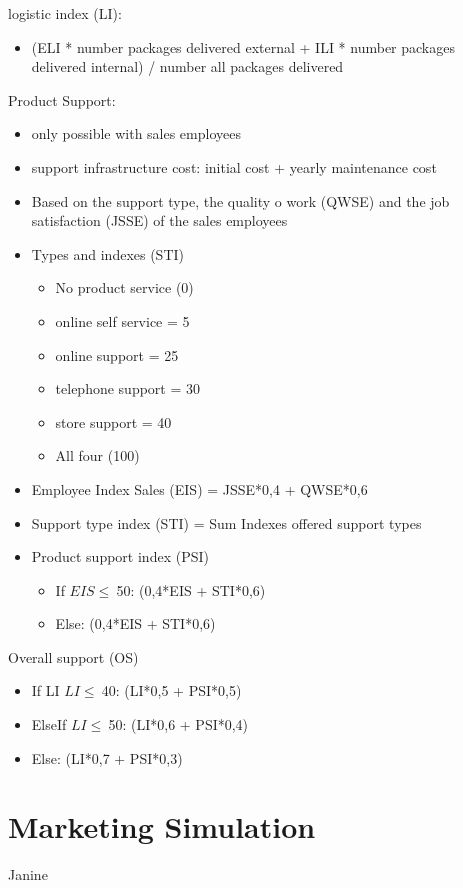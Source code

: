 \documentclass[11pt,titlepage,oneside,openany]{book}
\begin{document}
logistic index (LI):
\begin{itemize}
\item (ELI * number packages delivered external + ILI * number packages delivered internal) / number all packages delivered 
\end{itemize}

Product Support:
\begin{itemize}
\item only possible with sales employees 
\item support infrastructure cost: initial cost + yearly maintenance cost  
\item Based on the support type, the quality o work (QWSE) and the job satisfaction (JSSE) of the sales employees
\item Types and indexes (STI)
\begin{itemize}
\item No product service (0)
\item online self service = 5
\item online support = 25
\item telephone support = 30  
\item store support = 40
\item All four (100)
\end{itemize}
\item Employee Index Sales (EIS) = JSSE*0,4 + QWSE*0,6
\item Support type index (STI) = Sum Indexes offered support types
\item Product support index (PSI) 
\begin{itemize}
\item If $EIS \leq \ $50: (0,4*EIS + STI*0,6)
\item Else: (0,4*EIS + STI*0,6)
\end{itemize}
\end{itemize}

Overall support (OS)
\begin{itemize}
\item If LI $LI \leq \ $40: (LI*0,5 + PSI*0,5)
\item ElseIf $LI \leq \ $50: (LI*0,6 + PSI*0,4)
\item Else: (LI*0,7 + PSI*0,3)
\end{itemize}

\section{Marketing Simulation}
Janine 
\end{document}
